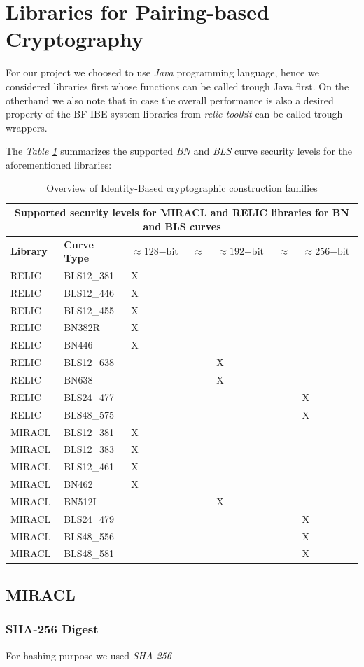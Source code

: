 
\section{Libraries for Pairing-based Cryptography}
\label{sec:apx.libpbc}

For our project we choosed to use \textit{Java} programming language,
hence we considered libraries first whose functions can be called
trough Java first. On the otherhand we also note that in case the overall
performance is also a desired property of the BF-IBE system libraries from
\textit{relic-toolkit}\cite{relic-toolkit} can be called trough wrappers.

The \textit{Table \ref{tab:libpbc}} summarizes the supported \textit{BN} and \textit{BLS} curve security levels for the aforementioned libraries:


\begin{table}[h]
	\centering
	\begin{tabular}{ |p{2cm}||p{3cm}|p{2cm}|p{1cm}|p{2cm}|p{1cm}|p{2cm}| }
		\hline
		\multicolumn{7}{|c|}{ \textbf{Supported security levels for MIRACL and RELIC libraries for BN and BLS curves} } \\
		\hline
		\textbf{Library}	& \textbf{Curve Type} & $\approx 128\mathrm{-bit}$ & $\approx$ & $\approx 192\mathrm{-bit}$ & $\approx$ & $\approx 256\mathrm{-bit}$ \\
			\hline 

RELIC & BLS12\_381 & X & & & & \\
RELIC & BLS12\_446 & X & & & & \\
RELIC & BLS12\_455 & X & & & & \\
RELIC & BN382R    & X & & & & \\
RELIC & BN446     & X & & & & \\
RELIC & BLS12\_638 & & & X & & \\
RELIC & BN638      & & & X & & \\
RELIC & BLS24\_477 & & & & & X \\
RELIC & BLS48\_575 & & & & & X \\

\hline

MIRACL & BLS12\_381 & X & & & & \\
MIRACL & BLS12\_383 & X & & & & \\
MIRACL & BLS12\_461 & X & & & & \\
MIRACL & BN462      & X & & & & \\
MIRACL & BN512I     & & & X & & \\
MIRACL & BLS24\_479 & & & & & X \\
MIRACL & BLS48\_556 & & & & & X \\
MIRACL & BLS48\_581 & & & & & X \\				
		\hline
	\end{tabular}
	\caption{ Overview of Identity-Based cryptographic construction families  \cite{theory.ec.ibeupdate}}
	\label{tab:libpbc}
\end{table}

\subsection{MIRACL}

\subsubsection{SHA-256 Digest}
For hashing purpose we used \textit{SHA-256}

